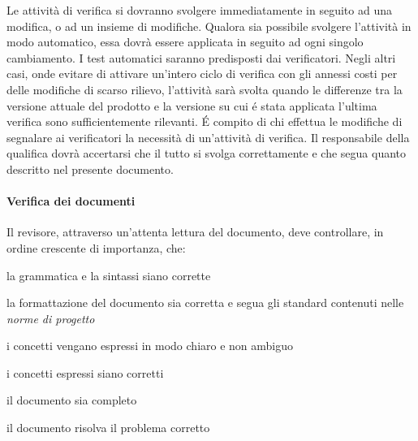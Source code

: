 Le attivit\`a di verifica si dovranno svolgere immediatamente in seguito ad una modifica, o ad un insieme di modifiche. Qualora sia possibile svolgere l'attivit\`a in modo automatico, essa dovr\`a essere applicata in seguito ad ogni singolo cambiamento. I test automatici saranno predisposti dai verificatori. Negli altri casi, onde evitare di attivare un'intero ciclo di verifica con gli annessi costi per delle modifiche di scarso rilievo, l'attivit\`a sar\`a svolta quando le differenze tra la versione attuale del prodotto e la versione su cui \'e stata applicata l'ultima verifica sono sufficientemente rilevanti. \'E compito di chi effettua le modifiche di segnalare ai verificatori la necessit\`a di un'attivit\`a di verifica. Il responsabile della qualifica dovr\`a accertarsi che il tutto si svolga correttamente e che segua quanto descritto nel presente documento.
\paragraph{Verifica dei documenti} Il revisore, attraverso un'attenta lettura del documento, deve controllare, in ordine crescente di importanza, che:
\begin{elenconumerato}[\textbf{}]{\subsubsecindent}
\item la grammatica e la sintassi siano corrette
\item la formattazione del documento sia corretta e segua gli standard contenuti nelle \textit{norme di progetto}
\item i concetti vengano espressi in modo chiaro e non ambiguo
\item i concetti espressi siano corretti
\item il documento sia completo
\item il documento risolva il problema corretto
\end{elenconumerato}
